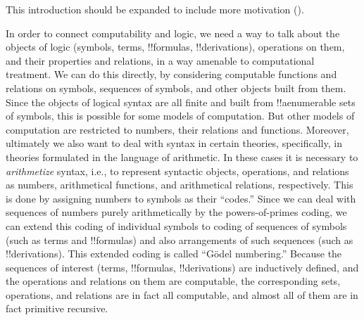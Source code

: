 \documentclass[../../../include/open-logic-section]{subfiles}
\begin{document}

\begin{editorial}
  This introduction should be expanded to include more motivation
  ().
\end{editorial}

In order to connect computability and logic, we need a way to talk
about the objects of logic (symbols, terms, !!{formula}s,
!!{derivation}s), operations on them, and their properties and
relations, in a way amenable to computational treatment.  We can do
this directly, by considering computable functions and relations on
symbols, sequences of symbols, and other objects built from them.
Since the objects of logical syntax are all finite and built from
!!a{enumerable} sets of symbols, this is possible for some models of
computation.  But other models of computation are restricted to
numbers, their relations and functions.  Moreover, ultimately we also
want to deal with syntax in certain theories, specifically, in
theories formulated in the language of arithmetic.  In these cases it
is necessary to \emph{arithmetize} syntax, i.e., to represent
syntactic objects, operations, and relations as numbers, arithmetical
functions, and arithmetical relations, respectively.  This is done by
assigning numbers to symbols as their ``codes.'' Since we can deal
with sequences of numbers purely arithmetically by the
powers-of-primes coding, we can extend this coding of individual
symbols to coding of sequences of symbols (such as terms and
!!{formula}s) and also arrangements of such sequences (such as
!!{derivation}s).  This extended coding is called ``G\"odel
numbering.''  Because the sequences of interest (terms, !!{formula}s,
!!{derivation}s) are inductively defined, and the operations and
relations on them are computable, the corresponding sets, operations,
and relations are in fact all computable, and almost all of them are
in fact primitive recursive.
\end{document}
